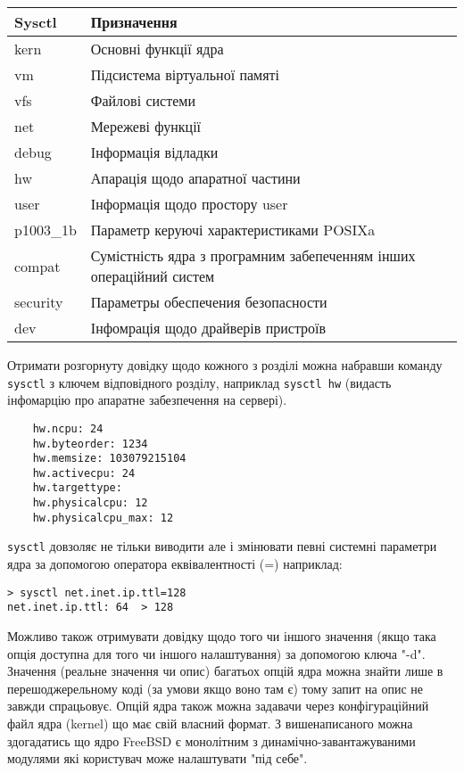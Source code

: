 \begin{itemize}
\begin{center}
  \begin{tabular}{ l | l  }
    \textbf{Sysctl} & \textbf{Призначення} \\ \hline
    kern & Основні функції ядра  \\ \hline
    vm & Підсистема віртуальної памяті  \\ \hline
    vfs & Файлові системи \\ \hline
    net & Мережеві функції  \\ \hline
    debug & Інформація відладки  \\ \hline
    hw & Апарація щодо апаратної частини  \\ \hline
    user & Інформація щодо простору user   \\ \hline
    p1003\_1b & Параметр керуючі характеристиками POSIXa  \\ \hline
    compat & Сумістність ядра з програмним забепеченням інших операційний систем  \\ \hline
    security & Параметры обеспечения безопасности \\ \hline
    dev & Інфомрація щодо драйверів пристроїв \\
  \end{tabular}
\end{center}

Отримати розгорнуту довідку щодо кожного з розділі можна набравши команду \texttt{sysctl} з ключем відповідного розділу, наприклад \texttt{sysctl hw} (видасть інфомарцію про апаратне забезпечення
на сервері).

\begin{lstlisting}
    hw.ncpu: 24
    hw.byteorder: 1234
    hw.memsize: 103079215104
    hw.activecpu: 24
    hw.targettype:
    hw.physicalcpu: 12
    hw.physicalcpu_max: 12
\end{lstlisting}

\texttt{sysctl} довзоляє не тільки виводити але і змінювати певні системні параметри ядра за допомогою оператора еквівалентності (=) наприклад:

\begin{lstlisting}
> sysctl net.inet.ip.ttl=128
net.inet.ip.ttl: 64  > 128
\end{lstlisting}

Можливо також отримувати довідку щодо того чи іншого значення (якщо така опція доступна для того чи іншого налаштування) за допомогою ключа "-d". Значення (реальне значення чи опис) багатьох опцій ядра можна знайти лише в перешоджерельному коді (за умови якщо воно там є) тому запит на опис не завжди спрацьовує. Опцій ядра також можна задавачи через конфігураційний файл ядра (kernel) що має свій власний формат. З вишенаписаного можна здогадатись що ядро FreeBSD є монолітним з динамічно-завантажуваними модулями які користувач може налаштувати "під себе".



\end{itemize}
